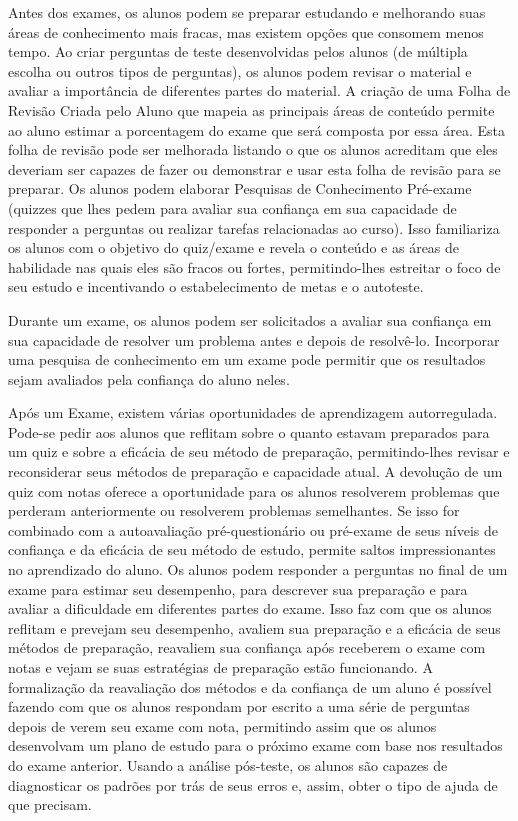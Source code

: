 Antes dos exames, os alunos podem se preparar estudando e melhorando suas áreas de conhecimento mais fracas, mas existem opções que consomem menos tempo. Ao criar perguntas de teste desenvolvidas pelos alunos (de múltipla escolha ou outros tipos de perguntas), os alunos podem revisar o material e avaliar a importância de diferentes partes do material. A criação de uma Folha de Revisão Criada pelo Aluno que mapeia as principais áreas de conteúdo permite ao aluno estimar a porcentagem do exame que será composta por essa área. Esta folha de revisão pode ser melhorada listando o que os alunos acreditam que eles deveriam ser capazes de fazer ou demonstrar e usar esta folha de revisão para se preparar. Os alunos podem elaborar Pesquisas de Conhecimento Pré-exame (quizzes que lhes pedem para avaliar sua confiança em sua capacidade de responder a perguntas ou realizar tarefas relacionadas ao curso). Isso familiariza os alunos com o objetivo do quiz/exame e revela o conteúdo e as áreas de habilidade nas quais eles são fracos ou fortes, permitindo-lhes estreitar o foco de seu estudo e incentivando o estabelecimento de metas e o autoteste.

Durante um exame, os alunos podem ser solicitados a avaliar sua confiança em sua capacidade de resolver um problema antes e depois de resolvê-lo. Incorporar uma pesquisa de conhecimento em um exame pode permitir que os resultados sejam avaliados pela confiança do aluno neles.

Após um Exame, existem várias oportunidades de aprendizagem autorregulada. Pode-se pedir aos alunos que reflitam sobre o quanto estavam preparados para um quiz e sobre a eficácia de seu método de preparação, permitindo-lhes revisar e reconsiderar seus métodos de preparação e capacidade atual. A devolução de um quiz com notas oferece a oportunidade para os alunos resolverem problemas que perderam anteriormente ou resolverem problemas semelhantes. Se isso for combinado com a autoavaliação pré-questionário ou pré-exame de seus níveis de confiança e da eficácia de seu método de estudo, permite saltos impressionantes no aprendizado do aluno. Os alunos podem responder a perguntas no final de um exame para estimar seu desempenho, para descrever sua preparação e para avaliar a dificuldade em diferentes partes do exame. Isso faz com que os alunos reflitam e prevejam seu desempenho, avaliem sua preparação e a eficácia de seus métodos de preparação, reavaliem sua confiança após receberem o exame com notas e vejam se suas estratégias de preparação estão funcionando. A formalização da reavaliação dos métodos e da confiança de um aluno é possível fazendo com que os alunos respondam por escrito a uma série de perguntas depois de verem seu exame com nota, permitindo assim que os alunos desenvolvam um plano de estudo para o próximo exame com base nos resultados do exame anterior. Usando a análise pós-teste, os alunos são capazes de diagnosticar os padrões por trás de seus erros e, assim, obter o tipo de ajuda de que precisam.

